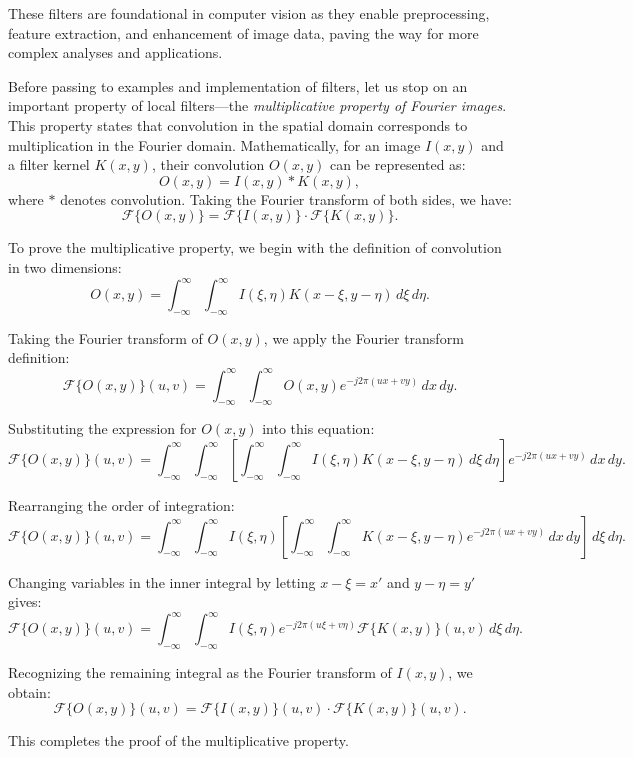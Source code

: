 \documentclass[11pt]{book}
\begin{document}
These filters are foundational in computer vision as they enable preprocessing, feature extraction, and enhancement of image data, paving the way for more complex analyses and applications.


Before passing to examples and implementation of filters, let us stop on an important property of local filters—the \emph{multiplicative property of Fourier images}. This property states that convolution in the spatial domain corresponds to multiplication in the Fourier domain. Mathematically, for an image $I(x, y)$ and a filter kernel $K(x, y)$, their convolution $O(x, y)$ can be represented as:
\[
O(x, y) = I(x, y) * K(x, y),
\]
where $*$ denotes convolution. Taking the Fourier transform of both sides, we have:
\[
\mathcal{F}\{O(x, y)\} = \mathcal{F}\{I(x, y)\} \cdot \mathcal{F}\{K(x, y)\}.
\]

To prove the multiplicative property, we begin with the definition of convolution in two dimensions:
\[
O(x, y) = \int_{-\infty}^{\infty} \int_{-\infty}^{\infty} I(\xi, \eta) K(x-\xi, y-\eta) \, d\xi \, d\eta.
\]

Taking the Fourier transform of $O(x, y)$, we apply the Fourier transform definition:
\[
\mathcal{F}\{O(x, y)\}(u, v) = \int_{-\infty}^{\infty} \int_{-\infty}^{\infty} O(x, y) e^{-j2\pi(ux + vy)} \, dx \, dy.
\]

Substituting the expression for $O(x, y)$ into this equation:
\[
\mathcal{F}\{O(x, y)\}(u, v) = \int_{-\infty}^{\infty} \int_{-\infty}^{\infty} \left[ \int_{-\infty}^{\infty} \int_{-\infty}^{\infty} I(\xi, \eta) K(x-\xi, y-\eta) \, d\xi \, d\eta \right] e^{-j2\pi(ux + vy)} \, dx \, dy.
\]

Rearranging the order of integration:
\[
\mathcal{F}\{O(x, y)\}(u, v) = \int_{-\infty}^{\infty} \int_{-\infty}^{\infty} I(\xi, \eta) \left[ \int_{-\infty}^{\infty} \int_{-\infty}^{\infty} K(x-\xi, y-\eta) e^{-j2\pi(ux + vy)} \, dx \, dy \right] \, d\xi \, d\eta.
\]

Changing variables in the inner integral by letting $x-\xi = x'$ and $y-\eta = y'$ gives:
\[
\mathcal{F}\{O(x, y)\}(u, v) = \int_{-\infty}^{\infty} \int_{-\infty}^{\infty} I(\xi, \eta) e^{-j2\pi(u\xi + v\eta)} \mathcal{F}\{K(x, y)\}(u, v) \, d\xi \, d\eta.
\]

Recognizing the remaining integral as the Fourier transform of $I(x, y)$, we obtain:
\[
\mathcal{F}\{O(x, y)\}(u, v) = \mathcal{F}\{I(x, y)\}(u, v) \cdot \mathcal{F}\{K(x, y)\}(u, v).
\]

This completes the proof of the multiplicative property.
\end{document}
